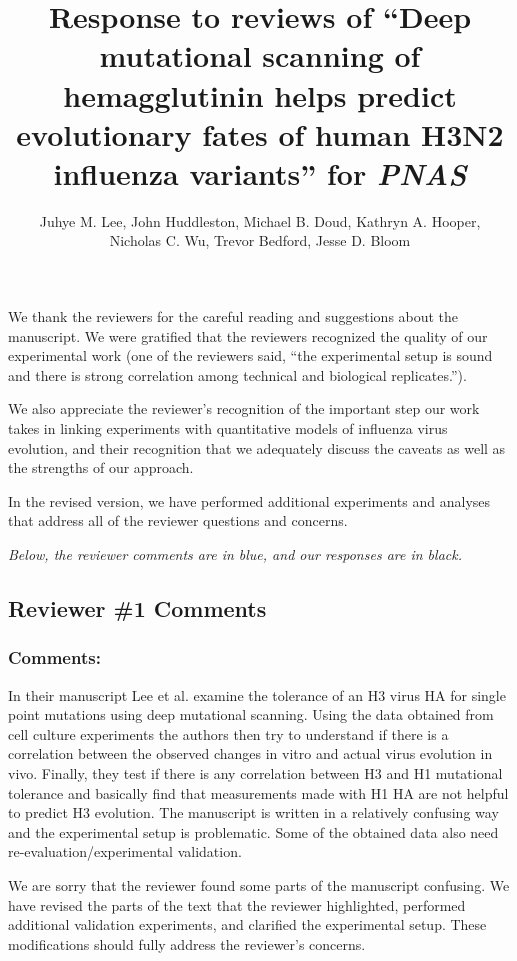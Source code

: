 \documentclass[11pt, oneside]{article}   	%
\title{Response to reviews of ``Deep mutational scanning of hemagglutinin helps predict evolutionary fates of human H3N2 influenza variants'' for \textit{PNAS}}
\author{Juhye M. Lee, John Huddleston, Michael B. Doud, Kathryn A. Hooper,\\Nicholas C. Wu, Trevor Bedford, Jesse D. Bloom}
\newcommand{\response}[1]{{\color{black}#1}}
\begin{document}
\maketitle

We thank the reviewers for the careful reading and suggestions about the manuscript.
We were gratified that the reviewers recognized the quality of our experimental work (one of the reviewers said, ``the experimental setup is sound and there is strong correlation among technical and biological replicates.'').

We also appreciate the reviewer's recognition of the important step our work takes in linking experiments with quantitative models of influenza virus evolution, and their recognition that we adequately discuss the caveats as well as the strengths of our approach.

In the revised version, we have performed additional experiments and analyses that address all of the reviewer questions and concerns.

\emph{Below, the reviewer comments {\color{blue} are in blue}, and our responses are in black.}

\color{blue}

\subsection*{Reviewer \#1 Comments}

\subsubsection*{Comments:} 
In their manuscript Lee et al. examine the tolerance of an H3 virus HA for single point mutations using deep mutational scanning. Using the data obtained from cell culture experiments the authors then try to understand if there is a correlation between the observed changes in vitro and actual virus evolution in vivo. Finally, they test if there is any correlation between H3 and H1 mutational tolerance and basically find that measurements made with H1 HA are not helpful to predict H3 evolution. The manuscript is written in a relatively confusing way and the experimental setup is problematic. Some of the obtained data also need re-evaluation/experimental validation. 

\response{We are sorry that the reviewer found some parts of the manuscript confusing.
We have revised the parts of the text that the reviewer highlighted, performed additional validation experiments, and clarified the experimental setup.
These modifications should fully address the reviewer's concerns.}
\end{document}
